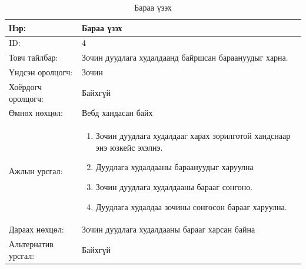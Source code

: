 \begin{center}
	\begin{table}[!htbp]
		\caption{Бараа үзэх}
		\begin{tabular}{|p{4cm}|p{11cm}|}
			\hline
			Нэр: & Бараа үзэх  \\
			\hline
			ID: & 4 \\
			\hline
			Товч тайлбар: & Зочин дуудлага худалдаанд байршсан бараануудыг харна.  \\
			\hline
			Үндсэн оролцогч: & Зочин \\
			\hline
			Хоёрдогч оролцогч: & Байхгүй  \\
			\hline
			Өмнөх нөхцөл: &  Вебд хандасан байх \\
			\hline
			Ажлын урсгал: &  \begin{enumerate}
								\item Зочин дуудлага худалдааг харах зорилготой хандснаар энэ юзкейс эхэлнэ.
								\item Дуудлага худалдааны бараануудыг харуулна
								\item Зочин дуудлага худалдааны барааг сонгоно.
								\item Дуудлага худалдаа зочины сонгосон барааг харуулна.  
							\end{enumerate}	 \\
						\hline
			Дараах нөхцөл: & Зочин дуудлага худалдааны барааг харсан байна \\
			\hline 
			Альтернатив урсгал: & Байхгүй \\
			\hline
		\end{tabular}
	\end{table}
\end{center}


